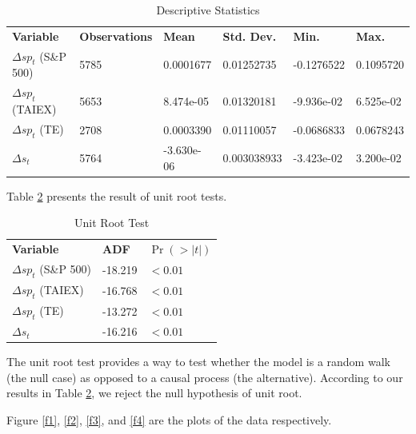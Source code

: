 \documentclass[]{AEA}
\begin{document}
\begin{spacing}{2.0}
\begin{table}
\caption{Descriptive Statistics}
\label{t2}
\begin{tabular}{llllll}
\textbf{Variable} & \textbf{Observations} & \textbf{Mean} & \textbf{Std. Dev.} & \textbf{Min.} & \textbf{Max.} \\
$\Delta sp_t$ (S\&P 500) & 5785 & 0.0001677 & 0.01252735 & -0.1276522 & 0.1095720 \\
$\Delta sp_t$ (TAIEX) & 5653 & 8.474e-05 & 0.01320181 & -9.936e-02 & 6.525e-02 \\
$\Delta sp_t$ (TE) & 2708 & 0.0003390 & 0.01110057 & -0.0686833 & 0.0678243 \\
$\Delta s_t$ & 5764 & -3.630e-06 & 0.003038933 & -3.423e-02 & 3.200e-02 \\
\end{tabular}
\end{table}

Table \ref{t3} presents the result of unit root tests.

\begin{table}
\caption{Unit Root Test}
\label{t3}
\begin{tabular}{lll}
\textbf{Variable} & \textbf{ADF} &\textbf{$\Pr(>|t|)$} \\
$\Delta sp_t$ (S\&P 500) &  -18.219 & $<0.01$\\
$\Delta sp_t$ (TAIEX) & -16.768 & $<0.01$ \\
$\Delta sp_t$ (TE) & -13.272 & $<0.01$ \\
$\Delta s_t$ &  -16.216 & $<0.01$\\
\end{tabular}
\end{table}

The unit root test provides a way to test whether the model is a random walk (the null case) as opposed to a causal process (the alternative). According to our results in Table \ref{t3}, we reject the null hypothesis of unit root.

Figure \ref{f1}, \ref{f2}, \ref{f3}, and \ref{f4} are the plots of the data respectively.


\end{spacing}
\end{document}

